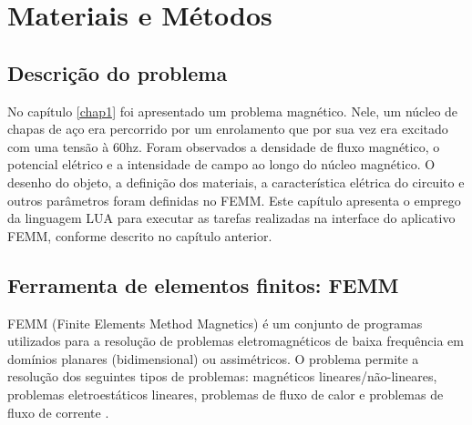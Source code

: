 \section{Materiais e Métodos}

\subsection{Descrição do problema}
No capítulo \ref{chap1} foi apresentado um problema magnético. Nele, um núcleo de chapas de aço era percorrido por um enrolamento que por sua vez era excitado com uma tensão à 60hz. Foram observados a densidade de fluxo magnético, o potencial elétrico e a intensidade de campo ao longo do núcleo magnético. O desenho do objeto, a definição dos materiais, a característica elétrica do circuito e outros parâmetros foram definidas no FEMM. Este capítulo apresenta o emprego da linguagem LUA para executar as tarefas realizadas na interface do aplicativo FEMM, conforme descrito no capítulo anterior.

\subsection{Ferramenta de elementos finitos: FEMM}
FEMM (Finite Elements Method Magnetics) é um conjunto de programas utilizados para a resolução de problemas eletromagnéticos de baixa frequência em domínios planares (bidimensional) ou assimétricos. O problema permite a resolução dos seguintes tipos de problemas: magnéticos lineares/não-lineares, problemas eletroestáticos lineares, problemas de fluxo de calor e problemas de fluxo de corrente \cite{Meeker2014}.

